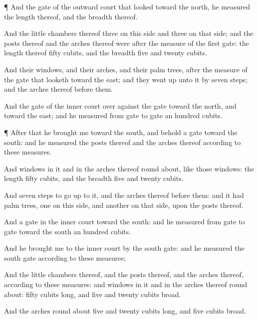 {\par }{\PP {}¶ And the
gate of the
outward
court that
looked
toward the
north, he
measured the
length thereof, and the
breadth thereof.

And the little
chambers thereof
{}
three on this side and
three on that side; and the
posts thereof and the
arches thereof were after the
measure of the
first
gate: the
length thereof
{}
fifty
cubits, and the
breadth
five and
twenty
cubits.

And their
windows, and their
arches, and their palm
trees,
{} after the
measure of the
gate that
looketh
toward the
east; and they went
up unto it by
seven
steps; and the
arches thereof
{}
before them.

And the
gate of the
inner
court
{} over against the
gate toward the
north, and toward the
east; and he
measured from
gate to
gate an
hundred
cubits.


\par }{\PP {}¶ After that he
brought me
toward the
south, and behold a
gate
toward the
south: and he
measured the
posts thereof and the
arches thereof according to these
measures.

And
{}
windows in it and in the
arches thereof round
about, like those
windows: the
length
{}
fifty
cubits, and the
breadth
five and
twenty
cubits.

And
{}
seven
steps to go
up to it, and the
arches thereof
{}
before them: and it had palm
trees,
one on this side, and
another on that side, upon the
posts thereof.


\par }{\PP {}And
{} a
gate in the
inner
court
toward the
south: and he
measured from
gate to
gate
toward the
south an
hundred
cubits.

And he
brought me to the
inner
court by the
south
gate: and he
measured the
south
gate according to these
measures;

And the little
chambers thereof, and the
posts thereof, and the
arches thereof, according to these
measures: and
{}
windows in it and in the
arches thereof round
about:
{}
fifty
cubits
long, and
five and
twenty
cubits
broad.

And the
arches round
about
{}
five and
twenty
cubits
long, and
five
cubits
broad.

}
